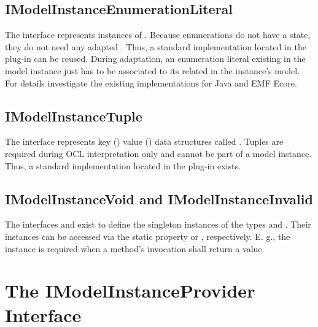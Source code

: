 \subsection{IModelInstanceEnumerationLiteral}

The interface  represents instances of . Because enumerations do not have a state, they do not need any adapted . Thus, a standard  implementation located in the plug-in  can be reused. During adaptation, an enumeration literal existing in the model instance just has to be associated to its related  in the instance's model. For details investigate the existing  implementations for Java and \acs{EMF} Ecore.


\subsection{IModelInstanceTuple}

The interface  represents key () value () data structures called . Tuples are required during \acs{OCL} interpretation only and cannot be part of a model instance. Thus, a standard  implementation located in the plug-in  exists.


\subsection{IModelInstanceVoid and IModelInstanceInvalid}

The interfaces  and  exist to define the singleton instances of the types  and . Their instances can be accessed via the static property  or , respectively. E. g., the  instance is required when a method's invocation shall return a  value.



\section{The IModelInstanceProvider Interface}

